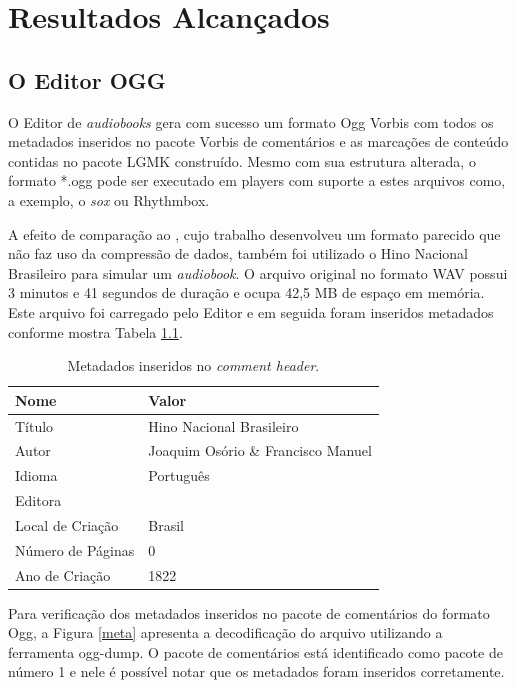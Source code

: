 \chapter[Resultados Alcançados]{Resultados Alcançados}\label{cap4}

\section{O Editor OGG}

O Editor de \textit{audiobooks} gera com sucesso um formato Ogg Vorbis com todos os metadados inseridos no pacote Vorbis de comentários e as marcações de conteúdo contidas no pacote LGMK construído. Mesmo com sua estrutura alterada, o formato *.ogg pode ser executado em players com suporte a estes arquivos como, a exemplo, o \textit{sox} ou Rhythmbox.

A efeito de comparação ao \cite{herbert}, cujo trabalho desenvolveu um formato parecido que não faz uso da compressão de dados, também foi utilizado o Hino Nacional Brasileiro para simular um \textit{audiobook}. O arquivo original no formato WAV possui 3 minutos e 41 segundos de duração e ocupa 42,5 MB de espaço em memória. Este arquivo foi carregado pelo Editor e em seguida foram inseridos metadados conforme mostra Tabela \ref{tab1}.

\begin{table}[ht]
\centering
\caption{Metadados inseridos no \textit{comment header}.}
\vspace{0.5cm}
\begin{tabular}{ll}

\hline
\textbf{Nome} & \textbf{Valor} \\
\hline
Título & Hino Nacional Brasileiro \\
Autor & Joaquim Osório \& Francisco Manuel \\
Idioma & Português \\
Editora & \\
Local de Criação & Brasil \\
Número de Páginas & 0 \\
Ano de Criação & 1822 \\
\hline

\end{tabular}
\label{tab1}
\end{table}

Para verificação dos metadados inseridos no pacote de comentários do formato Ogg, a Figura \ref{meta} apresenta a decodificação do arquivo utilizando a ferramenta ogg-dump. O pacote de comentários está identificado como pacote de número 1 e nele é possível notar que os metadados foram inseridos corretamente.

